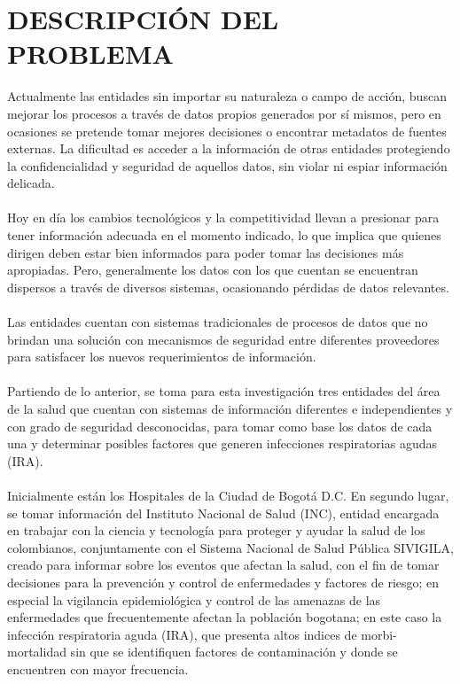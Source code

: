 \documentclass[a4paper,openright,12pt]{book}
\theoremstyle{definition}
\theoremstyle{remark}
\begin{document}
\section{DESCRIPCIÓN DEL PROBLEMA}

Actualmente las entidades sin importar su naturaleza o campo de acción, buscan mejorar los procesos a través de datos propios generados por sí mismos, pero en ocasiones  se pretende tomar mejores decisiones o encontrar metadatos de fuentes externas. La dificultad es acceder a la información de otras entidades protegiendo la confidencialidad y seguridad de aquellos datos, sin violar ni espiar información delicada.\\\\ Hoy en día los cambios tecnológicos y la competitividad llevan a presionar para tener información adecuada en el momento indicado, lo que implica que quienes dirigen deben estar bien informados para poder tomar las decisiones más apropiadas. Pero, generalmente los datos con los que cuentan se encuentran dispersos a través de diversos sistemas, ocasionando pérdidas de datos relevantes.\\\\
Las entidades cuentan con sistemas tradicionales de procesos de datos que no brindan una solución con mecanismos de seguridad entre diferentes proveedores para satisfacer los nuevos requerimientos de información.\\\\
Partiendo de lo anterior, se toma para esta investigación tres entidades del área de la salud que cuentan con sistemas de información diferentes e independientes y con grado de seguridad desconocidas, para tomar como base los datos de cada una y determinar posibles factores que generen infecciones respiratorias agudas (IRA).\\\\
Inicialmente están los Hospitales de la Ciudad de Bogotá D.C. En segundo lugar, se tomar información del Instituto Nacional de Salud (INC), entidad encargada en trabajar con la ciencia y tecnología para proteger y ayudar la salud de los colombianos, conjuntamente con el Sistema Nacional de Salud Pública SIVIGILA, creado para informar sobre los eventos que afectan la salud, con el fin de tomar decisiones para la prevención y control de enfermedades y factores de riesgo; en especial la vigilancia epidemiológica y control de las amenazas de las enfermedades que frecuentemente afectan la población bogotana; en este caso la infección respiratoria aguda (IRA), que presenta altos indices de morbi-mortalidad sin que se identifiquen factores de contaminación y donde se encuentren con mayor frecuencia.\\\\
\end{document}
